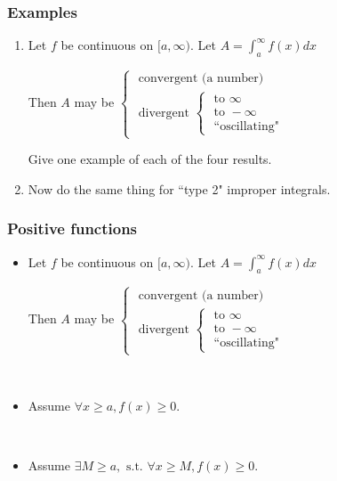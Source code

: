 \begin{frame}[t]
	\frametitle{Examples}

	\begin{enumerate}
		\item Let $f$ be continuous on $[a, \infty)$. Let
			$\displaystyle A = \int_{a}^{\infty}f(x) dx$

			Then $A$ may be $\displaystyle
			\begin{cases}
				\text{ convergent (a number) }                                                                                  \\
				\text{ divergent } \begin{cases}\text{ to } \infty \\ \text{ to } - \infty \\ \text{ ``oscillating"}\end{cases}
			\end{cases}$

			Give one example of each of the four results.
			\vfill

		\item Now do the same thing for ``type 2" improper integrals.
	\end{enumerate}
	\vfill
\end{frame}

\begin{frame}[t]
	\fontsize{13}{13}\selectfont
	\frametitle{Positive functions}

	\begin{itemize}
		\item Let $f$ be continuous on $[a, \infty)$. Let
			$\displaystyle A = \int_{a}^{\infty}f(x) dx$

			Then $A$ may be $\displaystyle
			\begin{cases}
				\text{ convergent (a number) }                                                                                  \\
				\text{ divergent } \begin{cases}\text{ to } \infty \\ \text{ to } - \infty \\ \text{ ``oscillating"}\end{cases}
			\end{cases}$

			\

		\item Assume $\displaystyle \forall x \geq a, f(x) \geq 0$.
			\vspace{.2cm}


			\

		\item Assume $\displaystyle \exists M \geq a, \text{ s.t. }\forall x \geq M,
			f(x) \geq 0$.
			\vspace{.2cm}

	\end{itemize}
\end{frame}

